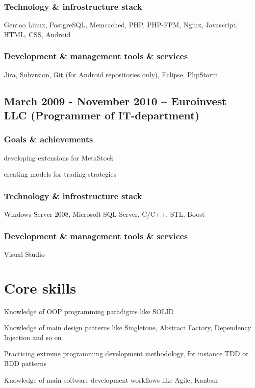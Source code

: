 \documentclass[9pt, a4paper, english]{extarticle}
\begin{document}
    \subsubsection* {Technology \& infrostructure stack}
      Gentoo Linux, PostgreSQL, Memcached, PHP, PHP-FPM, Nginx, Javascript,
      HTML, CSS, Android
    \subsubsection* {Development \& management tools \& services}
      Jira, Subvrsion, Git (for Android repositories only), Eclipse, PhpStorm


  \subsection* {March 2009 - November 2010 -- \textbf{Euroinvest LLC} (Programmer of IT-department)}
    \subsubsection* {Goals \& achievements}
      \begin {list}{\textbullet}{\itemsep=0mm}
        \item developing extensions for MetaStock
        \item creating models for trading strategies
      \end {list}
    \subsubsection* {Technology \& infrostructure stack}
      Windows Server 2008, Microsoft SQL Server, C/C++, STL, Boost
    \subsubsection* {Development \& management tools \& services}
      Visual Studio

\section* {Core skills}
  \begin {list}{\textbullet}{\itemsep=0mm}
    \item Knowledge of OOP programming paradigms like SOLID
    \item Knowledge of main design patterns like Singletone, Abstract Factory,
      Dependency Injection and so on
    \item Practicing extreme programming development methodology, for instance
      TDD or BDD patterns 
    \item Knowledge of main software development workflows like Agile, Kanban
  \end{list}
\end{document}

